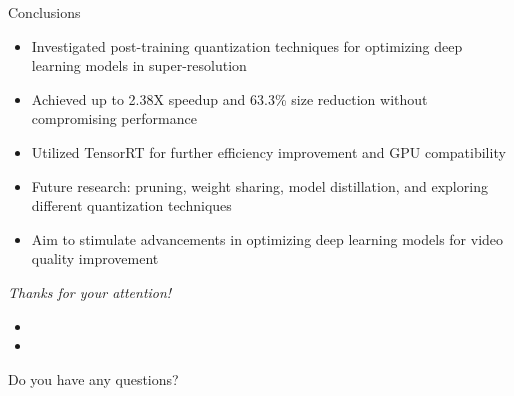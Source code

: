 \documentclass{beamer}
\begin{document}


\begin{frame}{Conclusions}
\begin{itemize}
  \item Investigated post-training quantization techniques for optimizing deep learning models in super-resolution
  \item Achieved up to 2.38X speedup and 63.3\% size reduction without compromising performance
  \item Utilized TensorRT for further efficiency improvement and GPU compatibility
  \item Future research: pruning, weight sharing, model distillation, and exploring different quantization techniques
  \item Aim to stimulate advancements in optimizing deep learning models for video quality improvement
\end{itemize}
\end{frame}

\begin{frame}[c,noframenumbering]

  {\Huge \emph{Thanks for your attention!}}

  \begin{itemize}
    \item[]
    \item[]
  \end{itemize}

  \LARGE Do you have any questions?

\end{frame}
\end{document}
